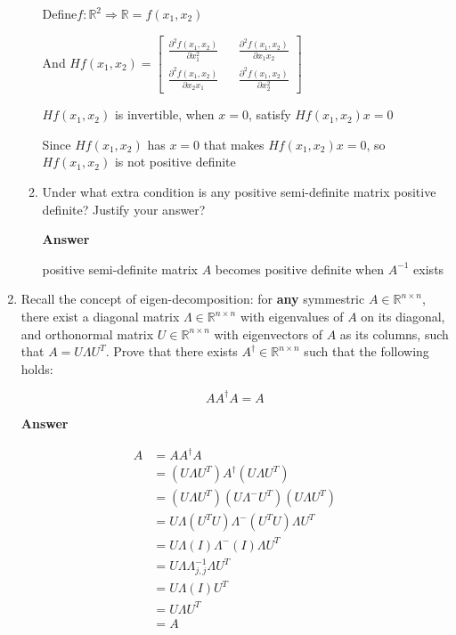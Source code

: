 \documentclass[11pt]{article}
\begin{document}
\begin{enumerate}[label=(\alph*)]
\begin{enumerate}[label=(\roman*)]
Define$f: \mathbb{R}^2 \Rightarrow \mathbb{R} = f(x_1, x_2)$ 

And $Hf(x_1, x_2) = 
\begin{bmatrix}
\frac{\partial^2 f(x_1, x_2)}{\partial x_1^2} && \frac{\partial^2 f(x_1, x_2)}{\partial x_1 x_2}\\
\frac{\partial^2 f(x_1, x_2)}{\partial x_2 x_1} && \frac{\partial^2 f(x_1, x_2)}{\partial x_2^2}
\end{bmatrix}
$ 

$Hf(x_1, x_2)$ is invertible, when $x = 0$, satisfy $Hf(x_1, x_2) x = 0$

Since $Hf(x_1, x_2)$ has $x = 0$ that makes $Hf(x_1, x_2) x = 0$, so $Hf(x_1, x_2)$ is not positive definite

\item Under what extra condition is any positive semi-definite matrix positive definite? Justify your answer?

\noindent\textbf{Answer}

positive semi-definite matrix $A$ becomes positive definite when $A^{-1}$ exists

\end{enumerate}

\item Recall the concept of eigen-decomposition: for \textbf{any} symmestric $A \in \mathbb{R}^{n \times n}$, there exist a diagonal matrix $\Lambda \in \mathbb{R}^{n \times n} $ with eigenvalues of $A$ on its diagonal, and orthonormal matrix $U \in \mathbb{R}^{n \times n}$ with eigenvectors of $A$ as its columns, such that $A=U\Lambda U^T$. 
Prove that there exists $A^{\dag} \in \mathbb{R}^{n \times n}$ such that the following holds:

\begin{equation}
AA^{\dag}A=A
\end{equation}

\noindent\textbf{Answer}

\begin{align*}
A &= AA^{\dag}A \\
&= (U\Lambda U^T)A^{\dag}(U\Lambda U^T) \\
&= (U\Lambda U^T) (U\Lambda^{-} U^T)(U\Lambda U^T) \\
&= U\Lambda (U^TU)\Lambda^{-}(U^TU)\Lambda U^T \\
&= U\Lambda (I)\Lambda^{-}(I)\Lambda U^T \\
&= U\Lambda \Lambda_{j,j}^{-1}\Lambda U^T \\
&= U\Lambda (I) U^T \\
&= U\Lambda U^T \\
&= A\\
\end{align*}

\end{enumerate}
\end{document}
